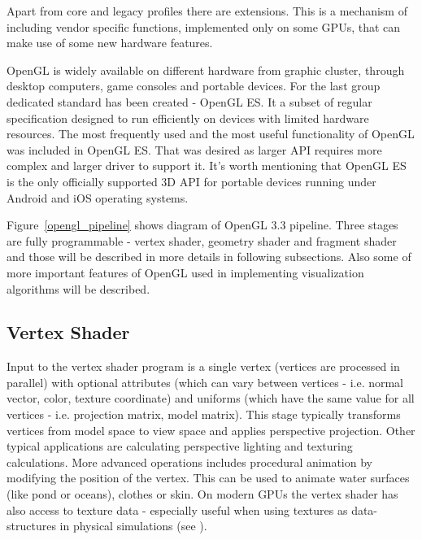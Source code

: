 Apart from core and legacy profiles there are extensions. This is a mechanism of including vendor specific functions, implemented only on some GPUs, that can make use of some new hardware features. 

OpenGL is widely available on different hardware from graphic cluster, through desktop computers, game consoles and portable devices. For the last group dedicated standard has been created - OpenGL ES. It a subset of regular specification designed to run efficiently on devices with limited hardware resources. The most frequently used and the most useful functionality of OpenGL was included in OpenGL ES. That was desired as larger API requires more complex and larger driver to support it. It's worth mentioning that OpenGL ES is the only officially supported 3D API for portable devices running under Android and iOS operating systems. 


Figure~\ref{opengl_pipeline} shows diagram of OpenGL 3.3 pipeline. Three stages are fully programmable - vertex shader, geometry shader and fragment shader and those will be described in more details in following subsections. Also some of more important features of OpenGL used in implementing visualization algorithms will be described.

\subsection{Vertex Shader}
Input to the vertex shader program is a single vertex (vertices are processed in parallel) with optional attributes (which can vary between vertices - i.e.  normal vector, color, texture coordinate) and uniforms (which have the same value for all vertices - i.e. projection matrix, model matrix). This stage typically transforms vertices from model space to view space and applies perspective projection. Other typical applications are calculating perspective lighting and texturing calculations. More advanced operations includes procedural animation by modifying the position of the vertex. This can be used to animate water surfaces (like pond or oceans), clothes or skin. On modern GPUs the vertex shader has also access to texture data - especially useful when using textures as data-structures in physical simulations (see \cite[pages~412-419]{OpenGLSuperbible}).


